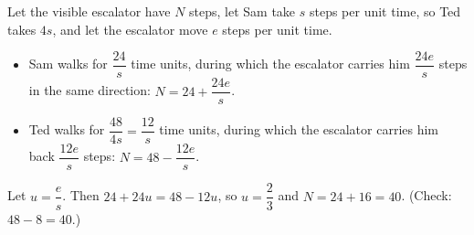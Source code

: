 Let the visible escalator have $N$ steps, let Sam take $s$ steps per unit time, so Ted takes $4s$, and let the escalator move $e$ steps per unit time.
\begin{itemize}
\item Sam walks for $\dfrac{24}{s}$ time units, during which the escalator carries him $\dfrac{24e}{s}$ steps in the same direction: $N=24+\dfrac{24e}{s}$.
\item Ted walks for $\dfrac{48}{4s}=\dfrac{12}{s}$ time units, during which the escalator carries him back $\dfrac{12e}{s}$ steps: $N=48-\dfrac{12e}{s}$.
\end{itemize}
Let $u=\dfrac{e}{s}$. Then $24+24u=48-12u$, so $u=\dfrac{2}{3}$ and $N=24+16=\boxed{40}$. (Check: $48-8=40$.)

